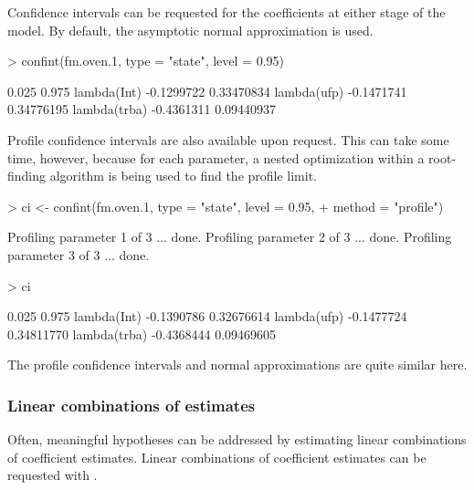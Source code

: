 \documentclass[article,shortnames]{jss}
\begin{document}
Confidence intervals can be requested for the coefficients at either
stage of the model.  By default, the asymptotic normal approximation
is used.

\begin{Schunk}
\begin{Sinput}
> confint(fm.oven.1, type = "state", level = 0.95)
\end{Sinput}
\begin{Soutput}
                  0.025      0.975
lambda(Int)  -0.1299722 0.33470834
lambda(ufp)  -0.1471741 0.34776195
lambda(trba) -0.4361311 0.09440937
\end{Soutput}
\end{Schunk}

Profile confidence intervals are also available upon request.  This
can take some time, however, because for each parameter, a nested
optimization within a root-finding algorithm is being used to find the
profile limit.

\begin{Schunk}
\begin{Sinput}
> ci <- confint(fm.oven.1, type = "state", level = 0.95, 
+     method = "profile")
\end{Sinput}
\begin{Soutput}
Profiling parameter 1 of 3 ... done.
Profiling parameter 2 of 3 ... done.
Profiling parameter 3 of 3 ... done.
\end{Soutput}
\end{Schunk}
\begin{Schunk}
\begin{Sinput}
> ci
\end{Sinput}
\begin{Soutput}
                  0.025      0.975
lambda(Int)  -0.1390786 0.32676614
lambda(ufp)  -0.1477724 0.34811770
lambda(trba) -0.4368444 0.09469605
\end{Soutput}
\end{Schunk}

The profile confidence intervals and normal approximations are quite
similar here.

\subsubsection{Linear combinations of estimates}

Often, meaningful hypotheses can be addressed by estimating linear
combinations of coefficient estimates.  Linear combinations of coefficient
estimates can be requested with .
\end{document}
